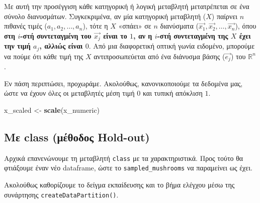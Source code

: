 \documentclass[
]{article}
\newenvironment{Shaded}{\begin{snugshade}}{\end{snugshade}}
\newcommand{\FunctionTok}[1]{\textcolor[rgb]{0.13,0.29,0.53}{\textbf{#1}}}
\newcommand{\NormalTok}[1]{#1}
\newcommand{\OtherTok}[1]{\textcolor[rgb]{0.56,0.35,0.01}{#1}}
\newcommand{\SpecialCharTok}[1]{\textcolor[rgb]{0.81,0.36,0.00}{\textbf{#1}}}
\begin{document}
Με αυτή την προσέγγιση κάθε κατηγορική ή λογική μεταβλητή μετατρέπεται
σε ένα σύνολο διανυσμάτων. Συγκεκριμένα, αν μία κατηγορική μεταβλητή
(\(X\)) παίρνει \(n\) πιθανές τιμές (\(a_1, a_2,\dots,a_n\)), τότε η
\(X\) «σπάει» σε \(n\) διανύσματα
(\(\vec{x_1}, \vec{x_2},\dots,\vec{x_n}\)), όπου \textbf{στη \(i\)-στή
συντεταγμένη του \(\vec{x_j}\) είναι το \(1\), αν η \(i\)-στή
συντεταγμένη της \(X\) έχει την τιμή \(a_j\), αλλιώς είναι \(0\)}. Από
μια διαφορετική οπτική γωνία ειδομένο, μπορούμε να πούμε ότι κάθε τιμή
της \(X\) αντιπροσωπεύεται από ένα διάνυσμα βάσης (\(\vec{e_j}\)) του
\(\mathbb{R}^n\).

Εν πάση περιπτώσει, προχωράμε. Ακολούθως, κανονικοποιούμε τα δεδομένα
μας, ώστε να έχουν όλες οι μεταβλητές μέση τιμή \(0\) και τυπική
απόκλιση \(1\).

\begin{Shaded}
\begin{Highlighting}[]
\NormalTok{x\_scaled }\OtherTok{\textless{}{-}} \FunctionTok{scale}\NormalTok{(x\_numeric)}
\end{Highlighting}
\end{Shaded}

\subsection{Με class (μέθοδος
Hold-out)}\label{ux3bcux3b5-class-ux3bcux3adux3b8ux3bfux3b4ux3bfux3c2-hold-out}

Αρχικά επανενώνουμε τη μεταβλητή \texttt{class} με τα χαρακτηριστικά.
Προς τούτο θα φτιάξουμε έναν νέο dataframe, ώστε το
\texttt{sampled\_mushrooms} να παραμείνει ως έχει.

\begin{Shaded}
\end{Shaded}

Ακολούθως καθορίζουμε το δείγμα εκπαίδευσης και το βήμα ελέγχου μέσω της
συνάρτησης \texttt{createDataPartition()}.
\end{document}
